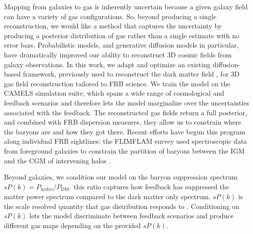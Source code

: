 \documentclass[twocolumn]{aastex631}
\begin{document}
Mapping from galaxies to gas is inherently uncertain because a given galaxy field can have a variety of gas configurations. So, beyond producing a single reconstruction, we would like a method that captures the uncertainty by producing a posterior distribution of gas rather than a single estimate with no error bars. Probabilistic models, and generative diffusion models in particular, have dramatically improved our ability to reconstruct 3D cosmic fields from galaxy observations. In this work, we adapt and optimize an existing diffusion-based framework, previously used to reconstruct the dark matter field \citep{ono2024}, for 3D gas field reconstruction tailored to FRB science. We train the model on the CAMELS simulation suite, which spans a wide range of cosmological and feedback scenarios and therefore lets the model marginalize over the uncertainties associated with the feedback. The reconstructed gas fields return a full posterior, and combined with FRB dispersion measures, they allow us to constrain where the baryons are and how they got there. Recent efforts have begun this program along individual FRB sightlines: the FLIMFLAM survey used spectroscopic data from foreground galaxies to constrain the partition of baryons between the IGM and the CGM of intervening halos \citep{Khrykin_2024, kglee23, simha2020, simha2023}.


Beyond galaxies, we condition our model on the baryon suppression spectrum $sP(k) = P_{\text{hydro}}/P_{\text{DM}}$. this ratio captures how feedback has suppressed the matter power spectrum compared to the dark matter only spectrum. $sP(k)$ is the scale resolved quantity that gas distribution responds to \citep{sharma2025}. Conditioning on $sP(k)$ lets the model discriminate between feedback scenarios and produce different gas maps depending on the provided $sP(k)$. 
\end{document}

